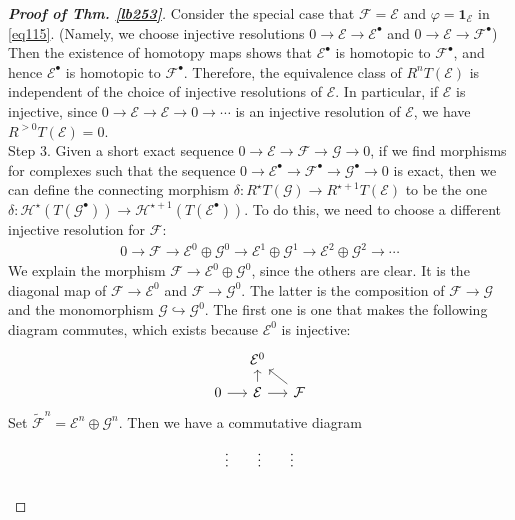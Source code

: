 \documentclass[12pt,b5paper,notitlepage]{report}
\theoremstyle{definition}
\theoremstyle{plain}
\newcommand{\mc}{\mathcal}
\newcommand{\wtd}{\widetilde}
\newcommand{\id}{\mathbf{1}}
\newcommand{\blt}{\bullet}
\numberwithin{equation}{section}
\begin{document}
\begin{proof}[\textbf{Proof of Thm. \ref{lb253}}]
Consider the special case that $\mc F=\mc E$ and $\varphi=\id_{\mc E}$ in \eqref{eq115}. (Namely, we choose injective resolutions $0\rightarrow\mc E\rightarrow\mc E^\blt$ and $0\rightarrow\mc E\rightarrow\mc F^\blt$) Then the existence of homotopy maps shows that $\mc E^\blt$ is homotopic to $\mc F^\blt$, and hence $\mc E^\blt$ is homotopic to $\mc F^\blt$. Therefore, the equivalence class of $R^nT(\mc E)$ is independent of the choice of injective resolutions of $\mc E$. In particular, if $\mc E$ is injective, since $0\rightarrow\mc E\rightarrow\mc E\rightarrow0\rightarrow\cdots$ is an injective resolution of $\mc E$, we have $R^{>0}T(\mc E)=0$. \\

Step 3. Given a short exact sequence $0\rightarrow\mc E\rightarrow\mc F\rightarrow\mc G\rightarrow 0$, if we find morphisms for complexes such that the sequence $0\rightarrow\mc E^\blt\rightarrow\mc F^\blt\rightarrow\mc G^\blt\rightarrow0$ is exact, then we can define the connecting morphism $\delta:R^\star T(\mc G)\rightarrow R^{\star+1}T(\mc E)$ to be the one $\delta:\mc H^\star(T(\mc G^\blt))\rightarrow\mc H^{\star+1}(T(\mc E^\blt))$. To do this, we need to choose a different injective resolution for $\mc F$: 
\begin{align*}
0\rightarrow\mc F\rightarrow\mc E^0\oplus \mc G^0\rightarrow\mc E^1\oplus \mc G^1\rightarrow\mc E^2\oplus \mc G^2\rightarrow\cdots
\end{align*}
We explain the morphism $\mc F\rightarrow\mc E^0\oplus \mc G^0$, since the others are clear. It is the diagonal map of $\mc F\rightarrow\mc E^0$ and $\mc F\rightarrow\mc G^0$. The latter is the composition of $\mc F\rightarrow \mc G$ and the monomorphism $\mc G\hookrightarrow\mc G^0$. The first one is one that makes the following diagram commutes, which exists because $\mc E^0$ is injective:
\begin{equation*}
\begin{tikzcd}[sep=small]
            & \mc E^0                   &                  \\
0 \arrow[r] & \mc E \arrow[r] \arrow[u] & \mc F \arrow[lu]
\end{tikzcd}
\end{equation*}
Set $\wtd{\mc F}^n=\mc E^n\oplus\mc G^n$. Then we have a commutative diagram
\begin{equation*}
\begin{tikzcd}[row sep=0.15in, column sep=small]
            & \vdots                      & \vdots                            & \vdots                      &   \\

\end{tikzcd}
\end{equation*}
\end{proof}
\end{document}
